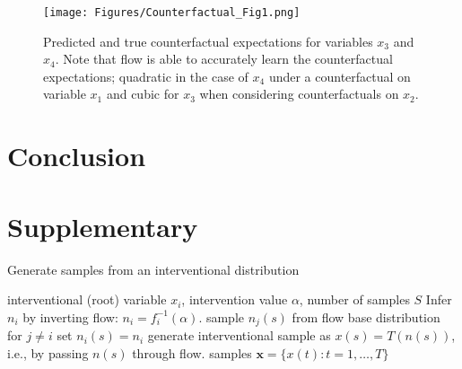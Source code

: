 \documentclass{article}
\begin{document}
\begin{figure}[ht]
	\vskip 0.2in
	\begin{center}
		\centerline{\texttt{[image: Figures/Counterfactual\_Fig1.png]}}
		\caption{Predicted and true counterfactual expectations  for variables $x_3$ and $x_4$. Note that 
			flow is able to accurately learn the counterfactual expectations; 
			quadratic in the case of  $x_4$ under a counterfactual on variable $x_1$ and 
			cubic for $x_3$ when considering counterfactuals on $x_2$.   }
		\label{Fig:counterfactualExample1}
	\end{center}
	\vskip -0.2in
\end{figure}


\section{Conclusion}



\newpage 

%


%

\section*{Supplementary}

\begin{algorithm}[hb]
	\caption{Generate samples from an interventional distribution}
	\label{alg:internvention}
	\begin{algorithmic}
		  interventional (root) variable $x_i$, intervention value $\alpha$, number of samples $S$
		\STATE Infer $n_i$ by inverting flow: $n_i = f_i^{-1}( \alpha)$. 
		\STATE sample $n_j(s)$ from flow base distribution for $j\neq i$
		\STATE set $n_i(s) = n_i$
		\STATE generate interventional sample as $x(s) = T ( n(s))$, i.e., 
		by passing $n(s)$ through flow. 
		\ENDFOR
		 samples $\mathbf{x} = \{x(t): t=1, \ldots, T\}$
	\end{algorithmic}
\end{algorithm}


 
\end{document}
